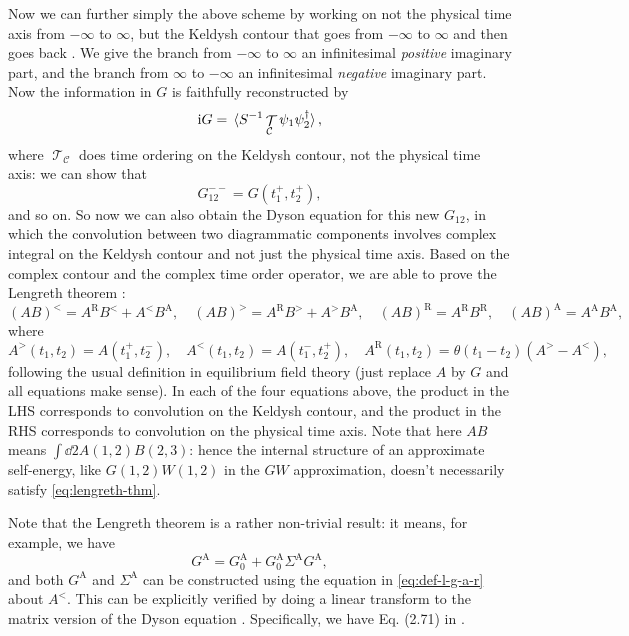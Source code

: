 \documentclass[hyperref, a4paper]{article}
\DeclareMathOperator{\timeorder}{\mathcal{T}}
\newcommand*{\ii}{\mathrm{i}}
\begin{document}
Now we can further simply the above scheme by working on 
not the physical time axis from $-\infty$ to $\infty$,
but the Keldysh contour that goes from $-\infty$ to $\infty$ 
and then goes back \cite{kremp2005quantum}.
We give the branch from $-\infty$ to $\infty$ an infinitesimal \emph{positive} imaginary part,
and the branch from $\infty$ to $-\infty$ an infinitesimal \emph{negative} imaginary part.
Now the information in $G$ is faithfully reconstructed by 
\begin{equation}
    \ii G = \expval*{S^{-1} \timeorder_{\mathcal{C}} \psi_1 \psi_2^\dagger},
\end{equation}
where $\timeorder_{\mathcal{C}}$ does time ordering on the Keldysh contour,
not the physical time axis:
we can show that 
\begin{equation}
    G^{--}_{12} = G(t_1^+, t_2^+), 
\end{equation}
and so on.
So now we can also obtain the Dyson equation for this new $G_{12}$,
in which the convolution between two diagrammatic components 
involves complex integral on the Keldysh contour 
and not just the physical time axis.
Based on the complex contour and the complex time order operator,
we are able to prove the Lengreth theorem \cite{vspivcka2005long}:
\begin{equation}
    (AB)^< = A^{\text{R}} B^< + A^< B^{\text{A}}, \quad 
    (AB)^> = A^{\text{R}} B^> + A^> B^{\text{A}}, \quad 
    (AB)^{\text{R}} = A^{\text{R}} B^{\text{R}}, \quad 
    (AB)^{\text{A}} = A^{\text{A}} B^{\text{A}},
    \label{eq:lengreth-thm}
\end{equation}
where 
\begin{equation}
    A^>(t_1, t_2) = A(t_1^+, t_2^-), \quad 
    A^<(t_1, t_2) = A(t_1^-, t_2^+), \quad 
    A^{\text{R}}(t_1, t_2) = \theta(t_1 - t_2) (A^> - A^<),
    \label{eq:def-l-g-a-r}
\end{equation}
following the usual definition in equilibrium field theory 
(just replace $A$ by $G$ and all equations make sense).
In each of the four equations above, 
the product in the LHS corresponds to 
convolution on the Keldysh contour,
and the product in the RHS corresponds to 
convolution on the physical time axis.
Note that here $AB$ means $\int \dd{2} A(1, 2) B(2, 3)$:
hence the internal structure of an approximate self-energy, like $G(1, 2) W(1, 2)$ in the $GW$ approximation,
doesn't necessarily satisfy \eqref{eq:lengreth-thm}.

Note that the Lengreth theorem is a rather non-trivial result: 
it means, for example, we have 
\begin{equation}
    G^{\text{A}} = G_0^{ \text{A}} + G_0^{ \text{A}} \Sigma^{\text{A}} G^{\text{A}},
\end{equation}
and both $G^{\text{A}}$ and $\Sigma^{\text{A}}$
can be constructed using the equation in \eqref{eq:def-l-g-a-r} about $A^<$.
This can be explicitly verified by 
doing a linear transform to the matrix version of the Dyson equation 
\cite{rammer1986quantum}.
Specifically, we have Eq. (2.71) in \cite{rammer1986quantum}.
\end{document}
